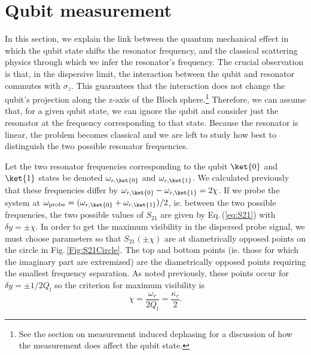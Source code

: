 \section{Qubit measurement}

In this section, we explain the link between the quantum mechanical effect in which the qubit state shifts the resonator frequency, and the classical scattering physics through which we infer the resonator's frequency.
The crucial observation is that, in the dispersive limit, the interaction between the qubit and resonator commutes with $\sigma_z$.
This guarantees that the interaction does not change the qubit's projection along the z-axis of the Bloch sphere.\footnote{See the section on measurement induced dephasing for a discussion of how the measurement does affect the qubit state.}
Therefore, we can assume that, for a given qubit state, we can ignore the qubit and consider just the resonator at the frequency corresponding to that state.
Because the resonator is linear, the problem becomes classical and we are left to study how best to distinguish the two possible resonator frequencies.

Let the two resonator frequencies corresponding to the qubit $\ket{0}$ and $\ket{1}$ states be denoted $\omega_{r,\ket{0}}$ and $\omega_{r,\ket{1}}$.
We calculated previously that these frequencies differ by $\omega_{r,\ket{0}} - \omega_{r,\ket{1}} = 2\chi$.
If we probe the system at $\omega_{\text{probe}} = (\omega_{r,\ket{0}} + \omega_{r,\ket{1}})/2$, ie. between the two possible frequencies, the two possible values of $S_{21}$ are given by Eq.\,(\ref{eq:S21}) with $\delta y = \pm \chi$.
In order to get the maximum visibility in the dispersed probe signal, we must choose parameters so that $S_{21}(\pm \chi)$ are at diametrically opposed points on the circle in Fig.\,\ref{Fig:S21Circle}.
The top and bottom points (ie. those for which the imaginary part are extremized) are the diametrically opposed points requiring the smallest frequency separation.
As noted previously, these points occur for $\delta y = \pm 1/2Q_l$ so the criterion for maximum visibility is \begin{equation}
\chi = \frac{\omega_r}{2Q_l} = \frac{\kappa_r}{2}. \label{eq:chiVsKappa_r} \end{equation}
